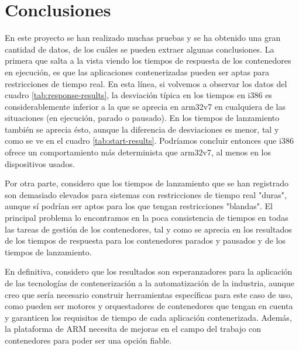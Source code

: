 \section{Conclusiones}

En este proyecto se han realizado muchas pruebas y se ha obtenido una gran
cantidad de datos, de los cuáles se pueden extraer algunas conclusiones. La
primera que salta a la vista viendo los tiempos de respuesta de los contenedores
en ejecución, es que las aplicaciones contenerizadas pueden ser aptas para
restricciones de tiempo real. En esta línea, si volvemos a observar los datos
del cuadro \ref{tab:response-results}, la desviación típica en los tiempos en
i386 es considerablemente inferior a la que se aprecia en arm32v7 en cualquiera
de las situaciones (en ejecución, parado o pausado). En los tiempos de
lanzamiento también se aprecia ésto, aunque la diferencia de desviaciones es
menor, tal y como se ve en el cuadro \ref{tab:start-results}. Podríamos concluir
entonces que i386 ofrece un comportamiento más determinista que arm32v7, al
menos en los dispositivos usados.

Por otra parte, considero que los tiempos de lanzamiento que se han registrado
son demasiado elevados para sistemas con restricciones de tiempo real "duras",
aunque sí podrían ser aptos para los que tengan restricciones "blandas". El
principal problema lo encontramos en la poca consistencia de tiempos en todas
las tareas de gestión de los contenedores, tal y como se aprecia en los
resultados de los tiempos de respuesta para los contenedores parados y pausados
y de los tiempos de lanzamiento.

En definitiva, considero que los resultados son esperanzadores para la
aplicación de las tecnologías de contenerización a la automatización de la
industria, aunque creo que sería necesario construir herramientas específicas
para este caso de uso, como pueden ser motores y orquestadores de contenedores
que tengan en cuenta y garanticen los requisitos de tiempo de cada aplicación
contenerizada. Además, la plataforma de ARM necesita de mejoras en el campo del
trabajo con contenedores para poder ser una opción fiable.
